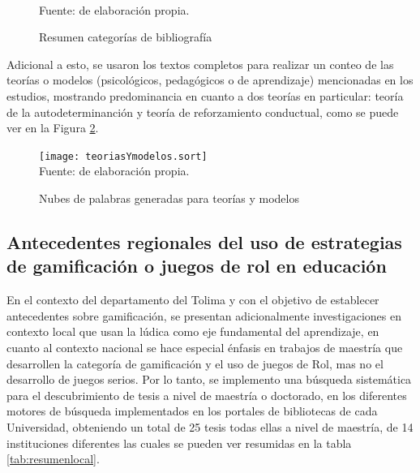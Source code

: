 \begin{figure}[ht]
\caption{Resumen categorías de bibliografía}
\label{img:catbib}
\centering
{}
\\
{\footnotesize Fuente: de elaboración propia.}
\end{figure}

\pagebreak

Adicional a esto, se usaron los textos completos para realizar un conteo de las teorías o modelos 
(psicológicos, pedagógicos o de aprendizaje) mencionadas en los estudios, mostrando predominancia en cuanto a 
dos teorías en particular: teoría de la autodeterminanción y teoría de reforzamiento conductual, 
como se puede ver en la Figura \ref{img:nubeteorias}.

\begin{figure}[H]
  \caption{Nubes de palabras generadas para teorías y modelos}
  \label{img:nubeteorias}
  \centering
  \texttt{[image: teoriasYmodelos.sort]}
  \\
  {\footnotesize Fuente: de elaboración propia.}
\end{figure}

\subsection{Antecedentes regionales del uso de estrategias de gamificación o juegos de rol en educación}

En el contexto del departamento del Tolima y con el objetivo de establecer antecedentes sobre gamificación, se 
presentan adicionalmente investigaciones en contexto local que usan la lúdica como eje fundamental del 
aprendizaje, en cuanto al contexto nacional se hace especial énfasis en trabajos de maestría que desarrollen 
la categoría de gamificación y el uso de juegos de Rol, mas no el desarrollo de juegos serios. Por lo tanto,
se implemento una búsqueda sistemática para el descubrimiento de tesis a nivel de maestría o doctorado, en los
diferentes motores de búsqueda implementados en los portales de bibliotecas de cada Universidad, obteniendo un 
total de 25 tesis todas ellas a nivel de maestría, de 14 instituciones diferentes las cuales se pueden ver 
resumidas en la tabla \ref{tab:resumenlocal}.

